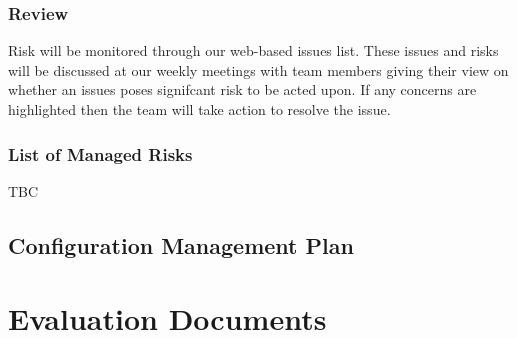 \documentclass{l3proj}
\begin{document}
\subsection{Review}
Risk will be monitored through our web-based issues list. These issues and risks will be discussed at our weekly meetings with team members giving their view on whether an issues poses signifcant risk to be acted upon. If any concerns are highlighted then the team will take action to resolve the issue.

\subsection{List of Managed Risks}

TBC

\section{Configuration Management Plan}
\label{sect:conf-man}


\chapter{Evaluation Documents}
\label{chap:eval-docs}
\end{document}
